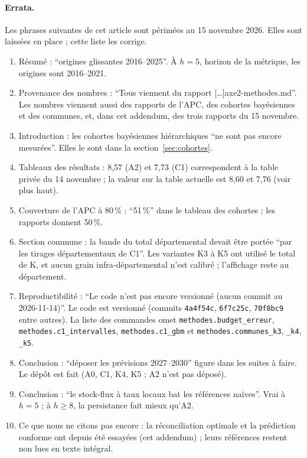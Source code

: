 \documentclass[11pt]{article}
\begin{document}
\paragraph{Errata.} Les phrases suivantes de cet article sont périmées au 15 novembre 2026. Elles sont laissées
en place ; cette liste les corrige.
\begin{enumerate}
  \item Résumé : \enquote{origines glissantes 2016--2025}. À $h = 5$, horizon de la métrique, les origines
        sont 2016--2021.
  \item Provenance des nombres : \enquote{Tous viennent du rapport [\dots]axe2-methodes.md}. Les nombres
        viennent aussi des rapports de l'APC, des cohortes bayésiennes et des communes, et, dans cet addendum,
        des trois rapports du 15 novembre.
  \item Introduction : les cohortes bayésiennes hiérarchiques \enquote{ne sont pas encore mesurées}. Elles le
        sont dans la section~\ref{sec:cohortes}.
  \item Tableaux des résultats : 8,57 (A2) et 7,73 (C1) correspondent à la table privée du 14 novembre ; la
        valeur sur la table actuelle est 8,60 et 7,76 (voir plus haut).
  \item Couverture de l'APC à 80\,\% : \enquote{51\,\%} dans le tableau des cohortes ; les rapports donnent
        50\,\%.
  \item Section commune : la bande du total départemental devait être portée \enquote{par les tirages
        départementaux de C1}. Les variantes K3 à K5 ont utilisé le total de K, et aucun grain
        infra-départemental n'est calibré ; l'affichage reste au département.
  \item Reproductibilité : \enquote{Le code n'est pas encore versionné (aucun commit au 2026-11-14)}. Le code
        est versionné (commits \texttt{4a4f54c}, \texttt{6f7c25c}, \texttt{70f8bc9} entre autres). La liste des
        commandes omet \texttt{methodes.budget\_erreur}, \texttt{methodes.c1\_intervalles},
        \texttt{methodes.c1\_gbm} et \texttt{methodes.communes\_k3}, \texttt{\_k4}, \texttt{\_k5}.
  \item Conclusion : \enquote{déposer les prévisions 2027--2030} figure dans les suites à faire. Le dépôt est
        fait (A0, C1, K4, K5 ; A2 n'est pas déposé).
  \item Conclusion : \enquote{le stock-flux à taux locaux bat les références naïves}. Vrai à $h = 5$ ; à
        $h \ge 8$, la persistance fait mieux qu'A2.
  \item Ce que nous ne citons pas encore : la réconciliation optimale et la prédiction conforme ont depuis été
        essayées (cet addendum) ; leurs références restent non lues en texte intégral.
\end{enumerate}
\end{document}
